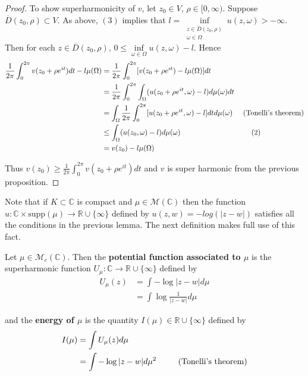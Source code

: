 \documentclass{amsart}
\newcommand{\C}{\mathbb{C}}
\newcommand{\MCM}{\mathcal{M}}
\newcommand{\RR}{\mathbb{R} \cup \{\infty\}}
\begin{document}
\begin{proof}
To show superharmonicity of $v$, let $z_0 \in V$, $\rho \in [0,\infty)$. Suppose $\overline{D}(z_0,\rho) \subset V$. As above, $(3)$ implies that $l= \inf\limits_{\substack{z \in \overline{D}(z_0,\rho) \\ \omega \in \Omega}}u(z, \omega)> -\infty$. Then for each $z \in \overline{D}(z_0,\rho)$, $0 \leq \inf\limits_{\omega \in \Omega}u(z, \omega) - l$. Hence  
\begin{align*}
\frac{1}{2\pi}\int_0^{2\pi}v(z_0 + \rho e^{it})dt - l\mu(\Omega)
&= \frac{1}{2\pi}\int_0^{2\pi}[v(z_0 + \rho e^{it}) - l\mu(\Omega)]dt\\
&= \frac{1}{2\pi}\int_0^{2\pi}\int_{\Omega}(u(z_0 + \rho e^{it}, \omega) - l)d\mu(\omega)dt\\
&= \int_{\Omega}\frac{1}{2\pi}\int_0^{2\pi}[u(z_0 + \rho e^{it}, \omega) - l]dtd\mu(\omega) \hspace{5mm} \text{(Tonelli's theorem)}\\
&\leq \int_{\Omega}(u(z_0, \omega) - l)d\mu(\omega) \hspace{34mm} (2)\\
&= v(z_0) - l\mu(\Omega)
\end{align*}  

Thus $v(z_0) \geq \frac{1}{2\pi}\int_0^{2\pi}v(z_0 + \rho e^{it})dt$ and $v$ is super harmonic from the previous proposition. 

\end{proof}

Note that if $K \subset \C$ is compact and $\mu \in \MCM(\C)$ then the function $u: \C \times \mathrm{supp}(\mu) \rightarrow \RR$ defined by $u(z,w) = -log(|z-w|)$ satisfies all the conditions in the previous lemma. The next definition makes full use of this fact.  

Let $\mu \in \MCM_c(\C)$. Then the \textbf{potential function associated to $\mu$} is the superharmonic function $U_{\mu}: \C \rightarrow \RR$ defined by 
\begin{align*}
U_{\mu}(z) 
&= \int-\log|z-w|d\mu\\
&= \int \log\frac{1}{|z-w|}d\mu
\end{align*}

and the \textbf{energy of $\mu$} is the quantity $I(\mu) \in \RR$ defined by 
\begin{align*}
I(\mu) 
&= \int U_{\mu}(z)d\mu \\
&= \int-\log|z-w|d\mu^2 \hspace{8mm} \text{ (Tonelli's theorem)}
\end{align*}
\end{document}
